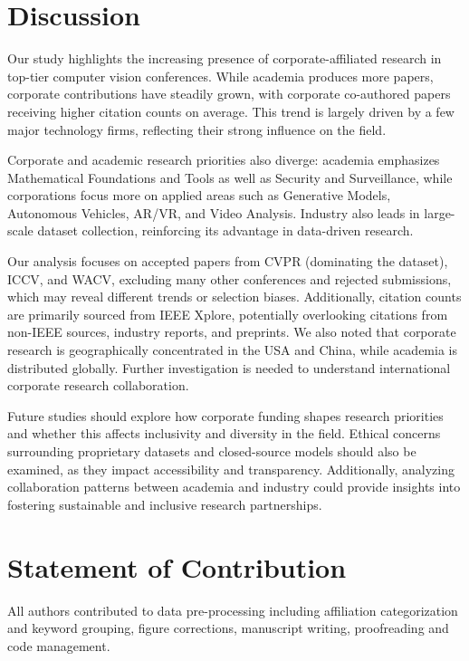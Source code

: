 \documentclass{article}
\begin{document}
\section{Discussion}
\vspace{-7pt}
Our study highlights the increasing presence of corporate-affiliated research in top-tier computer vision conferences. While academia produces more papers, corporate contributions have steadily grown, with corporate co-authored papers receiving higher citation counts on average. This trend is largely driven by a few major technology firms, reflecting their strong influence on the field.

Corporate and academic research priorities also diverge: academia emphasizes Mathematical Foundations and Tools as well as Security and Surveillance, while corporations focus more on applied areas such as Generative Models, Autonomous Vehicles, AR/VR, and Video Analysis. Industry also leads in large-scale dataset collection, reinforcing its advantage in data-driven research.

Our analysis focuses on accepted papers from CVPR (dominating the dataset), ICCV, and WACV, excluding many other conferences and rejected submissions, which may reveal different trends or selection biases. Additionally, citation counts are primarily sourced from IEEE Xplore, potentially overlooking citations from non-IEEE sources, industry reports, and preprints. We also noted that corporate research is geographically concentrated in the USA and China, while academia is distributed globally. Further investigation is needed to understand international corporate research collaboration.

Future studies should explore how corporate funding shapes research priorities and whether this affects inclusivity and diversity in the field. Ethical concerns surrounding proprietary datasets and closed-source models should also be examined, as they impact accessibility and transparency. Additionally, analyzing collaboration patterns between academia and industry could provide insights into fostering sustainable and inclusive research partnerships.
\vspace{-7pt}
\section{Statement of Contribution}
\vspace{-7pt}
All authors contributed to data pre-processing including affiliation categorization and keyword grouping, figure corrections, manuscript writing, proofreading and code management. 
\end{document}
